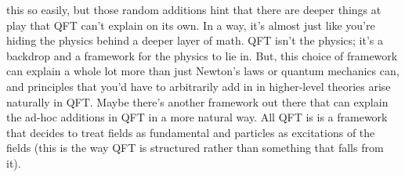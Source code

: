 this so easily, but those random additions hint that there are deeper things at play that QFT can't explain on its own. In a way, it's almost just like you're hiding the physics behind a deeper layer of math. QFT isn't the physics; it's a backdrop and a framework for the physics to lie in. But, this choice of framework can explain a whole lot more than just Newton's laws or quantum mechanics can, and principles that you'd have to arbitrarily add in in higher-level theories arise naturally in QFT. Maybe there's another framework out there that can explain the ad-hoc additions in QFT in a more natural way. All QFT is is a framework that decides to treat fields as fundamental and particles as excitations of the fields (this is the way QFT is structured rather than something that falls from it).
 